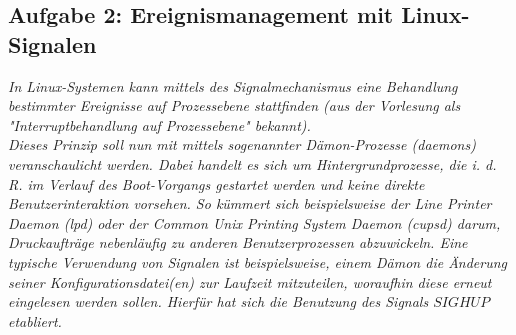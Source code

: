 \documentclass[a4paper]{article}
\begin{document}
\subsection{Aufgabe 2: Ereignismanagement mit Linux-Signalen}
\textit{In Linux-Systemen kann mittels des Signalmechanismus eine Behandlung bestimmter Ereignisse auf Prozessebene stattfinden (aus der Vorlesung als "Interruptbehandlung auf Prozessebene" bekannt).\\
    Dieses Prinzip soll nun mit mittels sogenannter Dämon-Prozesse (daemons) veranschaulicht werden. Dabei handelt es sich um Hintergrundprozesse, die i. d. R. im Verlauf des Boot-Vorgangs gestartet werden und keine direkte Benutzerinteraktion vorsehen.
    So kümmert sich beispielsweise der Line Printer Daemon (lpd) oder der Common Unix Printing System Daemon (cupsd) darum, Druckaufträge nebenläufig zu anderen Benutzerprozessen abzuwickeln.
    Eine typische Verwendung von Signalen ist beispielsweise, einem Dämon die Änderung seiner Konfigurationsdatei(en) zur Laufzeit mitzuteilen, woraufhin diese erneut eingelesen werden sollen.
    Hierfür hat sich die Benutzung des Signals $SIGHUP$ etabliert.
}
\vspace{10mm}
\end{document}
